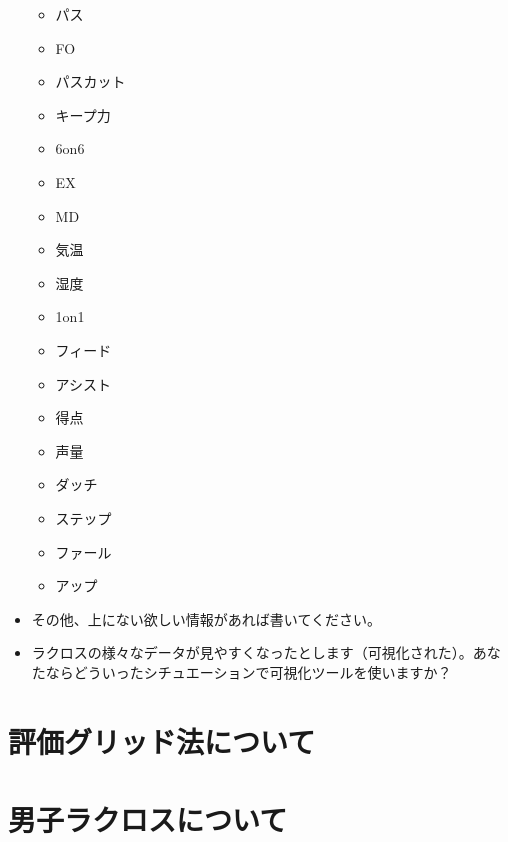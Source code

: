 \documentclass[sotsuron]{kuee}
\begin{document}
\begin{itemize}
\begin{itemize}
				\item パス
				\item FO
				\item パスカット
				\item キープ力
				\item 6on6
				\item EX
				\item MD
				\item 気温
				\item 湿度
				\item 1on1
				\item フィード
				\item アシスト
				\item 得点
				\item 声量
				\item ダッチ
				\item ステップ
				\item ファール
				\item アップ
			\end{itemize}
		\item その他、上にない欲しい情報があれば書いてください。
		\item ラクロスの様々なデータが見やすくなったとします（可視化された）。あなたならどういったシチュエーションで可視化ツールを使いますか？
	\end{itemize}

\chapter{評価グリッド法について}


\chapter{男子ラクロスについて}
\end{document}
